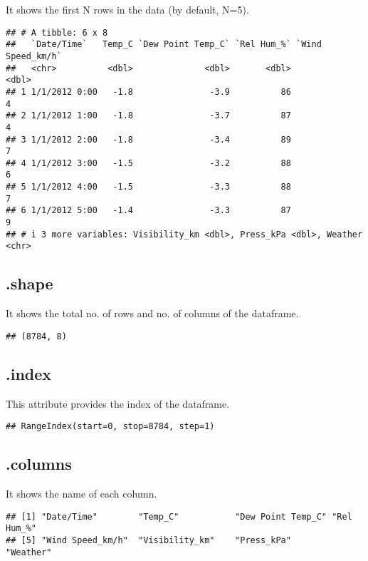 \documentclass[
]{article}
\begin{document}
It shows the first N rows in the data (by default, N=5).

\begin{verbatim}
## # A tibble: 6 x 8
##   `Date/Time`   Temp_C `Dew Point Temp_C` `Rel Hum_%` `Wind Speed_km/h`
##   <chr>          <dbl>              <dbl>       <dbl>             <dbl>
## 1 1/1/2012 0:00   -1.8               -3.9          86                 4
## 2 1/1/2012 1:00   -1.8               -3.7          87                 4
## 3 1/1/2012 2:00   -1.8               -3.4          89                 7
## 4 1/1/2012 3:00   -1.5               -3.2          88                 6
## 5 1/1/2012 4:00   -1.5               -3.3          88                 7
## 6 1/1/2012 5:00   -1.4               -3.3          87                 9
## # i 3 more variables: Visibility_km <dbl>, Press_kPa <dbl>, Weather <chr>
\end{verbatim}

\hypertarget{shape}{%
\subsection{.shape}\label{shape}}

It shows the total no. of rows and no. of columns of the dataframe.

\begin{verbatim}
## (8784, 8)
\end{verbatim}

\hypertarget{index}{%
\subsection{.index}\label{index}}

This attribute provides the index of the dataframe.

\begin{verbatim}
## RangeIndex(start=0, stop=8784, step=1)
\end{verbatim}

\hypertarget{columns}{%
\subsection{.columns}\label{columns}}

It shows the name of each column.

\begin{verbatim}
## [1] "Date/Time"        "Temp_C"           "Dew Point Temp_C" "Rel Hum_%"       
## [5] "Wind Speed_km/h"  "Visibility_km"    "Press_kPa"        "Weather"
\end{verbatim}
\end{document}
